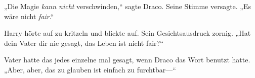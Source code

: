 „Die Magie \emph{kann nicht} verschwinden,“ sagte Draco. Seine Stimme versagte. „Es wäre nicht \emph{fair}.“

Harry hörte auf zu kritzeln und blickte auf. Sein Gesichtsausdruck zornig. „Hat dein Vater dir nie gesagt, das Leben ist nicht fair?“

Vater hatte das jedes einzelne mal gesagt, wenn Draco das Wort benutzt hatte. „Aber, aber, das zu glauben ist einfach zu furchtbar—“

